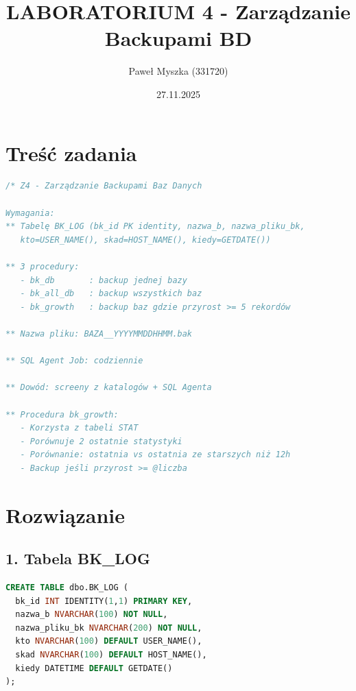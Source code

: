 \documentclass[a4paper,10pt]{article}
\title{LABORATORIUM 4 - Zarządzanie Backupami BD}
\author{Paweł Myszka (331720)}
\date{27.11.2025}
\begin{document}
	\maketitle
	
	\section{Treść zadania}
	
	\begin{lstlisting}[language=SQL, basicstyle=\ttfamily\small]
/* Z4 - Zarządzanie Backupami Baz Danych

Wymagania:
** Tabelę BK_LOG (bk_id PK identity, nazwa_b, nazwa_pliku_bk, 
   kto=USER_NAME(), skad=HOST_NAME(), kiedy=GETDATE())

** 3 procedury:
   - bk_db       : backup jednej bazy
   - bk_all_db   : backup wszystkich baz
   - bk_growth   : backup baz gdzie przyrost >= 5 rekordów
   
** Nazwa pliku: BAZA__YYYYMMDDHHMM.bak

** SQL Agent Job: codziennie

** Dowód: screeny z katalogów + SQL Agenta

** Procedura bk_growth:
   - Korzysta z tabeli STAT
   - Porównuje 2 ostatnie statystyki
   - Porównanie: ostatnia vs ostatnia ze starszych niż 12h
   - Backup jeśli przyrost >= @liczba
	\end{lstlisting}
	
	\section{Rozwiązanie}
	
	\subsection{1. Tabela BK\_LOG}
	\begin{lstlisting}[language=SQL]
CREATE TABLE dbo.BK_LOG (
  bk_id INT IDENTITY(1,1) PRIMARY KEY,
  nazwa_b NVARCHAR(100) NOT NULL,
  nazwa_pliku_bk NVARCHAR(200) NOT NULL,
  kto NVARCHAR(100) DEFAULT USER_NAME(),
  skad NVARCHAR(100) DEFAULT HOST_NAME(),
  kiedy DATETIME DEFAULT GETDATE()
);
	\end{lstlisting}
	
\end{document}
